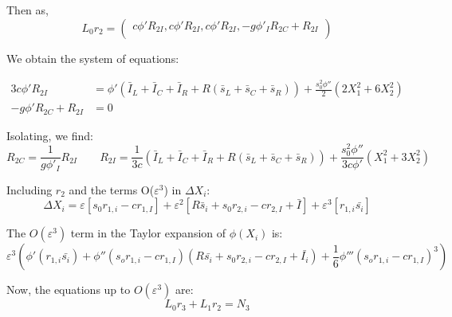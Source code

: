 \documentclass[ENG]{fancynotes}
\begin{document}
Then as, \[L_0r_2 = \begin{pmatrix}
c\phi'R_{2I},c\phi'R_{2I},c\phi'R_{2I}, -g\phi'_IR_{2C} +R_{2I}\\
\end{pmatrix}\]

We obtain the system of equations:
%

\begin{equation}
\begin{aligned}
3c\phi'R_{2I}  &= \phi'(\bar{I}_L+\bar{I}_C+\bar{I}_R + R(\bar{s}_L+ \bar{s}_C+ \bar{s}_R) )+ \frac{s_0^2\phi''}{2}\left(2X_1^2+6X_2^2 \right)\\[8pt]
-g\phi'R_{2C} +R_{2I} &= 0
\end{aligned}
\label{eq:}
\end{equation}


Isolating, we find:
\[
R_{2C} = \frac{1}{g\phi'_I}R_{2I} \qquad R_{2I} = \frac{1}{3c}(\bar{I}_L+\bar{I}_C+\bar{I}_R + R(\bar{s}_L+ \bar{s}_C+ \bar{s}_R))+ \frac{s_0^2\phi''}{3c\phi'}(X_1^2+3X_2^2)
\]

Including $r_2$ and the terms O($\varepsilon^3$) in $\Delta X_i$:
\begin{equation}
\Delta X_i = \varepsilon [s_0 r_{1,i}- cr_{1,I}] + \varepsilon^2[R\bar{s}_i + s_0r_{2,i} - c r_{2,I}+ \bar{I}] + \varepsilon^3 [r_{1,i}\bar{s_i} ]
\end{equation}

The $O(\varepsilon^3)$ term in the Taylor expansion of $\phi(X_i)$ is:
\begin{equation}
\varepsilon^3\left(\phi'(r_{1,i}\bar{s_i}) +\phi''(s_o r_{1,i}-cr_{1,I})(R\bar{s_i}+ s_0r_{2,i} - c r_{2,I}+ \bar{I_i}) + \frac{1}{6} \phi'''(s_o r_{1,i}-cr_{1,I})^3  \right) 
\end{equation}

Now, the equations up to $O(\varepsilon^3)$ are:
\[
L_0r_3 + L _{1} r_{2} = N _{3}
\]
\end{document}
